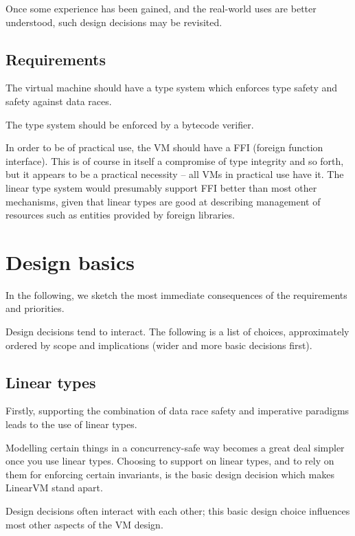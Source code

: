 \documentclass[a4paper]{book}
\begin{document}
Once some experience has been gained, and the real-world uses are
better understood, such design decisions may be revisited.


\section{Requirements}
The virtual machine should have a type system which
enforces type safety and safety against data races.

The type system should be enforced by a bytecode verifier.

In order to be of practical use, the VM should have a FFI (foreign
function interface).  This is of course in itself a compromise of
type integrity and so forth, but it appears to be a practical necessity
-- all VMs
in practical use have it.  The linear type system would presumably
support FFI better than most other mechanisms, given that linear types are good at
describing management of resources such as entities provided by
foreign libraries.

\chapter{Design basics}

In the following, we sketch the most immediate consequences of the
requirements and priorities.

Design decisions tend to interact.
The following is a list of choices, approximately ordered by scope and
implications (wider and more basic decisions first).

\section{Linear types}
Firstly, supporting the combination of data race safety and imperative
paradigms leads to the use of linear types.

Modelling certain things in a concurrency-safe way becomes a great deal simpler
once you use linear types.
Choosing to support on linear types, and to rely on them for enforcing
certain invariants, is the basic design decision which makes LinearVM
stand apart.

Design decisions often interact with each other; this basic design choice
influences most other aspects of the VM design.
\end{document}
